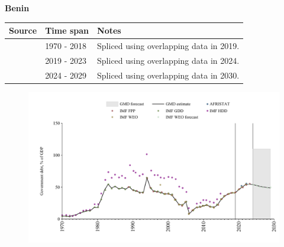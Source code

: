 \documentclass[12pt,a4paper,landscape]{article}
\begin{document}
\begin{adjustbox}{max totalsize={\paperwidth}{\paperheight},center}
\begin{minipage}[t][\textheight][t]{\textwidth}
\vspace*{0.5cm}
{}
\begin{center}
{\Large\bfseries Benin}
\end{center}
\vspace{0.5cm}
\begin{table}[H]
\centering
\small
\begin{tabular}{|l|l|l|}
\hline
\textbf{Source} & \textbf{Time span} & \textbf{Notes} \\
\hline
\rowcolor{white}\cite{IMF_GDD}& 1970 - 2018 &Spliced using overlapping data in 2019.\\
\rowcolor{lightgray}\cite{IMF_FPP}& 2019 - 2023 &Spliced using overlapping data in 2024.\\
\rowcolor{white}\cite{IMF_WEO_forecast}& 2024 - 2029 &Spliced using overlapping data in 2030.\\
\hline
\end{tabular}
\end{table}
\begin{figure}[H]
\centering
\includegraphics[width=\textwidth,height=0.6\textheight,keepaspectratio]{graphs/BEN_govdebt_GDP.pdf}
\end{figure}
\end{minipage}
\end{adjustbox}
\end{document}
